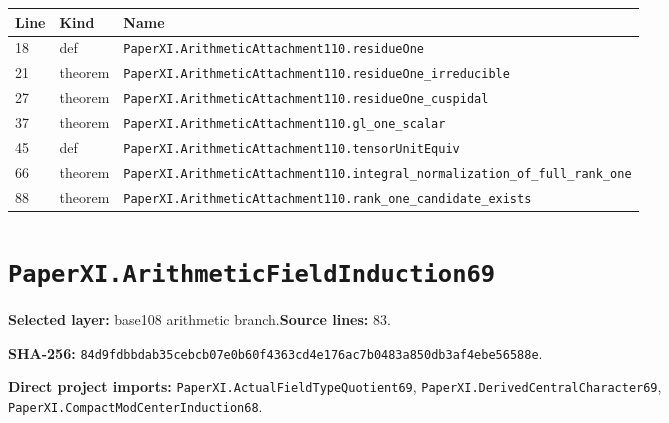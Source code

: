 \documentclass[10pt,oneside]{book}
\begin{document}
\begin{longtable}{@{}p{}p{}p{}@{}}\toprule Line&Kind&Name\\\midrule\endhead

18&def&\nolinkurl{PaperXI.ArithmeticAttachment110.residueOne}\\

21&theorem&\nolinkurl{PaperXI.ArithmeticAttachment110.residueOne_irreducible}\\

27&theorem&\nolinkurl{PaperXI.ArithmeticAttachment110.residueOne_cuspidal}\\

37&theorem&\nolinkurl{PaperXI.ArithmeticAttachment110.gl_one_scalar}\\

45&def&\nolinkurl{PaperXI.ArithmeticAttachment110.tensorUnitEquiv}\\

66&theorem&\nolinkurl{PaperXI.ArithmeticAttachment110.integral_normalization_of_full_rank_one}\\

88&theorem&\nolinkurl{PaperXI.ArithmeticAttachment110.rank_one_candidate_exists}\\

\bottomrule\end{longtable}

\section{\texorpdfstring{\nolinkurl{PaperXI.ArithmeticFieldInduction69}}{PaperXI.ArithmeticFieldInduction69}}\label{module:PaperXI.ArithmeticFieldInduction69}

\textbf{Selected layer:} base108 arithmetic branch.\quad\textbf{Source lines:} 83.\par\textbf{SHA-256:} {\scriptsize\nolinkurl{84d9fdbbdab35cebcb07e0b60f4363cd4e176ac7b0483a850db3af4ebe56588e}}.


\textbf{Direct project imports:} \nolinkurl{PaperXI.ActualFieldTypeQuotient69}, \nolinkurl{PaperXI.DerivedCentralCharacter69}, \nolinkurl{PaperXI.CompactModCenterInduction68}.
\end{document}
